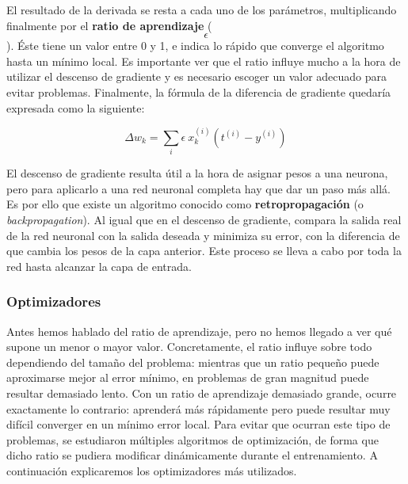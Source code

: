 El resultado de la derivada se resta a cada uno de los parámetros, multiplicando finalmente por el \textbf{ratio de aprendizaje} ($$\epsilon$$). Éste tiene un valor entre 0 y 1, e indica lo rápido que converge el algoritmo hasta un mínimo local. Es importante ver que el ratio influye mucho a la hora de utilizar el descenso de gradiente y es necesario escoger un valor adecuado para evitar problemas. Finalmente, la fórmula de la diferencia de gradiente quedaría expresada como la siguiente:

$$\Delta w_{k} = \sum_{i} \epsilon\ x_{k}^{(i)} (t^{(i)} - y^{(i)} )$$

El descenso de gradiente resulta útil a la hora de asignar pesos a una neurona, pero para aplicarlo a una red neuronal completa hay que dar un paso más allá. Es por ello que existe un algoritmo conocido como \textbf{retropropagación} (o \textit{backpropagation}). Al igual que en el descenso de gradiente, compara la salida real de la red neuronal con la salida deseada y minimiza su error, con la diferencia de que cambia los pesos de la capa anterior. Este proceso se lleva a cabo por toda la red hasta alcanzar la capa de entrada.

\subsubsection{Optimizadores}
Antes hemos hablado del ratio de aprendizaje, pero no hemos llegado a ver qué supone un menor o mayor valor. Concretamente, el ratio influye sobre todo dependiendo del tamaño del problema: mientras que un ratio pequeño puede aproximarse mejor al error mínimo, en problemas de gran magnitud puede resultar demasiado lento. Con un ratio de aprendizaje demasiado grande, ocurre exactamente lo contrario: aprenderá más rápidamente pero puede resultar muy difícil converger en un mínimo error local. 
Para evitar que ocurran este tipo de problemas, se estudiaron múltiples algoritmos de optimización, de forma que dicho ratio se pudiera modificar dinámicamente durante el entrenamiento. A continuación explicaremos los optimizadores más utilizados.

